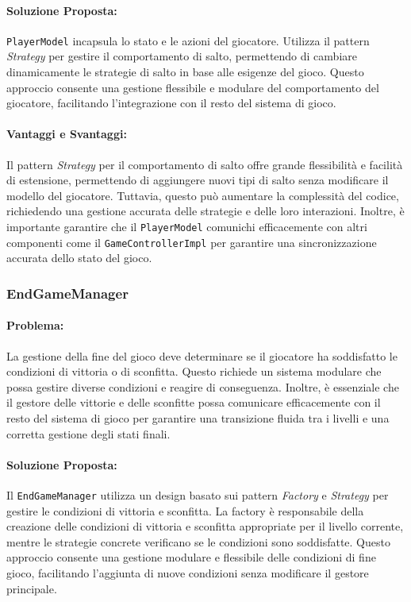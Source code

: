 \documentclass[a4paper,12pt]{report}
\begin{document}
	\paragraph{Soluzione Proposta:} \texttt{PlayerModel} incapsula lo stato e le azioni del giocatore. Utilizza il pattern \textit{Strategy} per gestire il comportamento di salto, permettendo di cambiare dinamicamente le strategie di salto in base alle esigenze del gioco. Questo approccio consente una gestione flessibile e modulare del comportamento del giocatore, facilitando l'integrazione con il resto del sistema di gioco.
	
	\paragraph{Vantaggi e Svantaggi:} 
	Il pattern \textit{Strategy} per il comportamento di salto offre grande flessibilità e facilità di estensione, permettendo di aggiungere nuovi tipi di salto senza modificare il modello del giocatore. Tuttavia, questo può aumentare la complessità del codice, richiedendo una gestione accurata delle strategie e delle loro interazioni. Inoltre, è importante garantire che il \texttt{PlayerModel} comunichi efficacemente con altri componenti come il \texttt{GameControllerImpl} per garantire una sincronizzazione accurata dello stato del gioco.
	
	\subsubsection{EndGameManager}
	
	\paragraph{Problema:} La gestione della fine del gioco deve determinare se il giocatore ha soddisfatto le condizioni di vittoria o di sconfitta. Questo richiede un sistema modulare che possa gestire diverse condizioni e reagire di conseguenza. Inoltre, è essenziale che il gestore delle vittorie e delle sconfitte possa comunicare efficacemente con il resto del sistema di gioco per garantire una transizione fluida tra i livelli e una corretta gestione degli stati finali.
	
	\paragraph{Soluzione Proposta:} Il \texttt{EndGameManager} utilizza un design basato sui pattern \textit{Factory} e \textit{Strategy} per gestire le condizioni di vittoria e sconfitta. La factory è responsabile della creazione delle condizioni di vittoria e sconfitta appropriate per il livello corrente, mentre le strategie concrete verificano se le condizioni sono soddisfatte. Questo approccio consente una gestione modulare e flessibile delle condizioni di fine gioco, facilitando l'aggiunta di nuove condizioni senza modificare il gestore principale.
	
\end{document}
